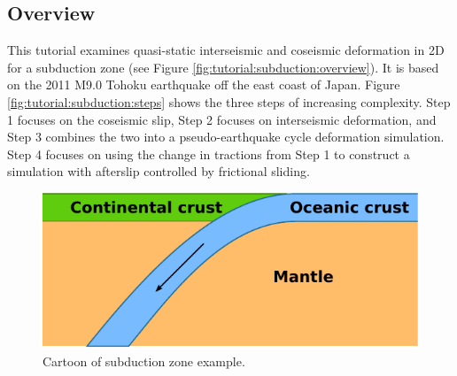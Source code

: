 \subsection{Overview}

This tutorial examines quasi-static interseismic and coseismic deformation
in 2D for a subduction zone (see Figure \vref{fig:tutorial:subduction:overview}).
It is based on the 2011 M9.0 Tohoku earthquake off the east coast
of Japan. Figure \vref{fig:tutorial:subduction:steps} shows the three
steps of increasing complexity. Step 1 focuses on the coseismic slip,
Step 2 focuses on interseismic deformation, and Step 3 combines the
two into a pseudo-earthquake cycle deformation simulation. Step 4
focuses on using the change in tractions from Step 1 to construct
a simulation with afterslip controlled by frictional sliding.

\begin{figure}
\begin{centering}
\includegraphics{tutorials/subduction/figs/cartoon_general}
\par\end{centering}

\caption{Cartoon of subduction zone example.\label{fig:tutorial:subduction:overview}}
\end{figure}


